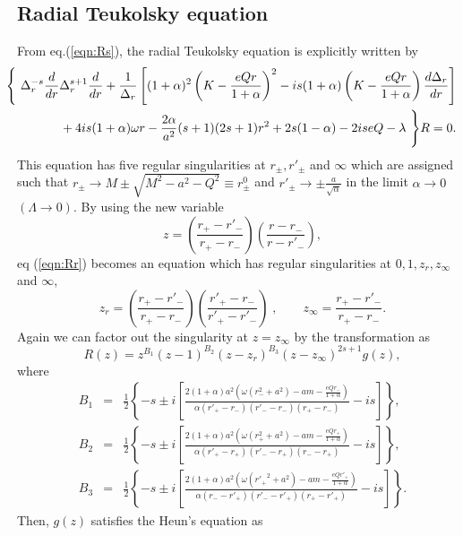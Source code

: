 \subsection{Radial Teukolsky equation}
From eq.(\ref{eqn:Rs}), the radial Teukolsky equation is explicitly 
written by 
\begin{eqnarray}
&&\makebox[-10mm]{}\Bigg\{ \ 
\Delta_r^{-s}\frac{d}{dr}\Delta_r^{s+1}\frac{d}{dr}
+\frac{1}{\Delta_r}\left[ (1+\alpha)^2 \left(K-\frac{eQr}{1+\alpha}
\right)^2
- is(1+\alpha)\left(K-\frac{eQr}{1+\alpha}\right) \frac{d\Delta_r}
{dr} \right] \nonumber \\
&& \makebox[-5mm]{}
+4is(1+\alpha)\omega r -\frac{2\alpha}{a^2}(s+1)(2s+1) r^2
+2s(1-\alpha)-2iseQ -\lambda \ \Bigg\} R = 0. \label{eqn:Rr}
\end{eqnarray}
This equation has five regular singularities at  $r_\pm, r'_\pm$ and 
$\infty$ which are assigned such that  
$r_\pm \rightarrow M\pm\sqrt{M^2-a^2-Q^2} \equiv r^0_\pm$ and 
$\displaystyle{r'_\pm \rightarrow \pm\frac{a}{\sqrt{\alpha}}}$ 
in the limit $\alpha \rightarrow 0$ $(\Lambda \rightarrow 0)$. 
By using the new variable 
$$
z=\left (\frac{r_+ - r'_-}{r_+ - r_-}\right )
\left ( \frac{r - r_-}{r - r'_-}\right ),
$$
eq (\ref{eqn:Rr}) becomes an equation which has regular singularities at 
$0, 1, z_r, z_\infty$ and $\infty$,
$$
z_r=\left(\frac{r_+ - r'_-}{r_+ - r_-}\right )\left(
 \frac{r'_+ - r_-}{r'_+ - r'_-}\right)\;,
\quad\quad
z_\infty=\frac{r_+ - r'_-}{r_+ - r_-}.
$$
Again we can factor out the singularity at $z=z_\infty$ by the 
transformation as 
%
\begin{equation}
R(z)=z^{B_1} (z-1)^{B_2} (z-z_r)^{B_3} (z-z_\infty)^{2s+1} g(z),
\end{equation}
%
where 
\begin{eqnarray}
B_1 &=& \frac{1}{2}\left\{-s \pm i\left[
\frac{2(1+\alpha)a^2
\left(\omega(r_-^2 + a^2)-am-\frac{eQr_-}{1+\alpha}\right)}
{\alpha(r'_+ - r_-)(r'_- - r_-)(r_+ - r_-)}
- is \right]\right\}, \nonumber \\
B_2 &=& \frac{1}{2}\left\{-s \pm i\left[
\frac{2(1+\alpha)a^2
\left(\omega(r_+^2 + a^2)-am-\frac{eQr_+}{1+\alpha}\right)}
{\alpha(r'_+ - r_+)(r'_- - r_+)(r_- - r_+)}
- is \right]\right\}, \nonumber \\
B_3 &=& \frac{1}{2}\left\{-s \pm i\left[
\frac{2(1+\alpha)a^2
\left(\omega({r'_+}^2 + a^2)-am-\frac{eQr'_+}
{1+\alpha}\right)}
{\alpha(r_- - r'_+)(r'_- - r'_+)(r_+ - r'_+)}
- is \right]\right\}. \nonumber 
\end{eqnarray}
Then, $g(z)$ satisfies the Heun's  equation as
